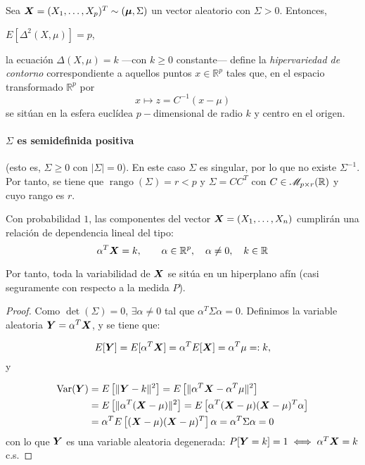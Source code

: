  \begin{nprop} Sea $\boldsymbol{X} = (X_1, \dots, X_p)^T \sim (\boldsymbol \mu, \Sigma)$ un vector aleatorio con $\Sigma > 0$. Entonces,
    \begin{nlist}
    \item $E[\Delta^2 (X,\mu)] = p$,
    \item la ecuación $\Delta(X,\mu) = k$ —con $k\geq 0$ constante— define la \textit{hipervariedad de contorno} correspondiente a aquellos puntos $x \in \mathbb R^p$ tales que, en el espacio transformado $\mathbb R^p$ por
      \[
      x \mapsto z = C^{-1}(x-\mu)
      \]
      se sitúan en la esfera euclídea $p-$dimensional de radio $k$ y centro en el origen.
    \end{nlist}

  \end{nprop}

\paragraph{$\Sigma$ es \textbf{semidefinida positiva}} (esto es, $\Sigma \geq 0$ con $|\Sigma| = 0$).  En este caso $\Sigma$ es singular, por lo que no existe $\Sigma ^{-1}$. Por tanto, se tiene que $\operatorname{rango}(\Sigma) = r < p$ y $\Sigma = C C^T$ con $C \in \mathscr{M}_{p\times r}(\mathbb{R})$ y cuyo rango es $r$.\\

  \begin{ncor}
    Con probabilidad $1$, las componentes del vector $\boldsymbol{X} = (X_1, \dots, X_n)$ cumplirán una relación de dependencia lineal del tipo:
    \[
    \alpha^T \boldsymbol{X} = k, \quad \quad \alpha \in \mathbb R^p, \quad \alpha \ne 0 , \quad k \in \mathbb{R}
    \]
    
  Por tanto, toda la variabilidad de $\boldsymbol{X}$ se sitúa en un hiperplano afín (casi seguramente con respecto a la medida $P$).
\end{ncor}

  \begin{proof}
    Como $\det(\Sigma) = 0$, $\exists \alpha \ne 0$ tal que $\alpha^T \Sigma \alpha = 0$. Definimos la variable aleatoria $\boldsymbol{Y} = \alpha^T \boldsymbol{X}$, y se tiene que:
    
    \[
      E[\boldsymbol{Y}] = E[\alpha^T \boldsymbol{X}] = \alpha^T E[\boldsymbol{X}] = \alpha^T \mu =: k
    ,\] y
    
     \[
        \begin{split}
          \operatorname{Var}(\boldsymbol{Y}) & = E\left[\|\boldsymbol{Y}-k\|^2\right]  = E\left[\|\alpha^T\boldsymbol{X} - \alpha^T \mu\|^2\right] \\
          & = E\left[\|\alpha^T(\boldsymbol{X}-\mu)\|^2\right] = E\left[\alpha^T(\boldsymbol{X}-\mu)(\boldsymbol{X}-\mu)^T\alpha\right] \\
          & = \alpha^T E\left[(\boldsymbol{X}-\mu)(\boldsymbol{X}-\mu)^T\right]\alpha = \alpha^T \Sigma \alpha = 0
        \end{split}  
     \]
      con lo que $\boldsymbol{Y}$ es una variable aleatoria degenerada: $P[\boldsymbol{Y} = k] = 1 \iff \alpha^T \boldsymbol{X} = k$ c.s.
  \end{proof}

